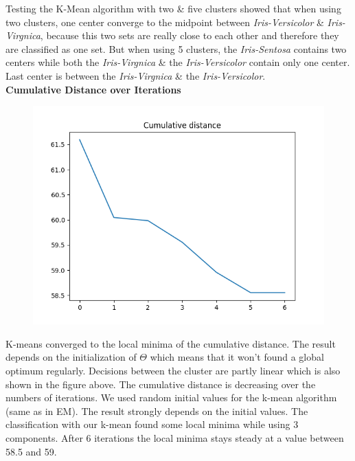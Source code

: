 \documentclass[a4paper]{article}
\begin{document}
\begin{enumerate}
Testing the K-Mean algorithm with two \& five clusters showed that when using two clusters, one center converge to the midpoint between \textit{Iris-Versicolor} \& \textit{Iris-Virgnica}, because this two sets are really close to each other and therefore they are classified as one set. But when using 5 clusters, the \textit{Iris-Sentosa} contains two centers while both the \textit{Iris-Virgnica} \& the \textit{Iris-Versicolor} contain only one center. Last center is between the \textit{Iris-Virgnica} \& the \textit{Iris-Versicolor}.\\

{\large \textbf{Cumulative Distance over Iterations}} \\


\begin{figure}[htp]
\centering
\includegraphics[scale=0.5]{plots/CC_scenario1_cmpnt3.png}
  \label{fig:17}
\end{figure}

K-means converged to the local minima of the cumulative distance. The result depends on the initialization of $\Theta$ which means that it won't found a global optimum regularly. Decisions between the cluster are partly linear which is also shown in the figure above. The cumulative distance is decreasing over the numbers of iterations. We used random initial values for the k-mean algorithm (same as in EM). The result strongly depends on the initial values. The classification with our k-mean found some local minima while using 3 components. After 6 iterations the local minima stays steady at a value between 58.5 and 59. \newline \newline


\end{enumerate}
\end{document}
